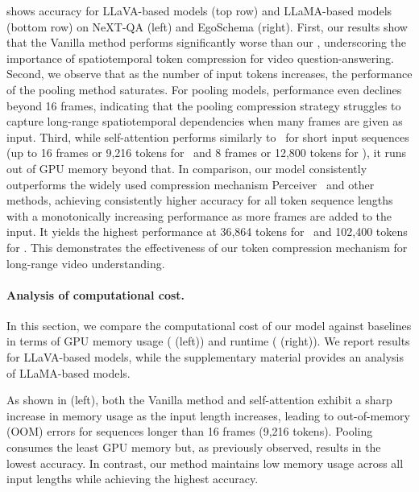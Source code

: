  shows accuracy for LLaVA-based models (top row) and LLaMA-based models (bottom row) on NeXT-QA (left) and EgoSchema (right). First, our results show that the Vanilla method performs significantly worse than our \model, underscoring the importance of spatiotemporal token compression for video question-answering. Second, we observe that as the number of input tokens increases, the performance of the pooling method saturates. For pooling models, performance even declines beyond 16 frames, indicating that the pooling compression strategy struggles to capture long-range spatiotemporal dependencies when many frames are given as input. Third, while self-attention performs similarly to \model\ for short input sequences (up to 16 frames or 9,216 tokens for \modelLlava\ and 8 frames or 12,800 tokens for \modelLlama), it runs out of GPU memory beyond that. In comparison, our model consistently outperforms the widely used compression mechanism Perceiver~\cite{jaegle2021perceiver} and other methods, achieving consistently higher accuracy for all token sequence lengths with a monotonically increasing performance as more frames are added to the input. It yields the highest performance at 36,864 tokens for \modelLlava\ and 102,400 tokens for \modelLlama. This demonstrates the effectiveness of our token compression mechanism for long-range video understanding.





\vspace{-3mm}
\paragraph{Analysis of computational cost.}
\label{sec:computation}

In this section, we compare the computational cost of our model against baselines in terms of GPU memory usage ( (left)) and runtime ( (right)). We report results for LLaVA-based models, while the supplementary material provides an analysis of LLaMA-based models.

As shown in  (left), both the Vanilla method and self-attention exhibit a sharp increase in memory usage as the input length increases, leading to out-of-memory (OOM) errors for sequences longer than 16 frames (9,216 tokens). Pooling consumes the least GPU memory but, as previously observed, results in the lowest accuracy. In contrast, our method maintains low memory usage across all input lengths while achieving the highest accuracy.

